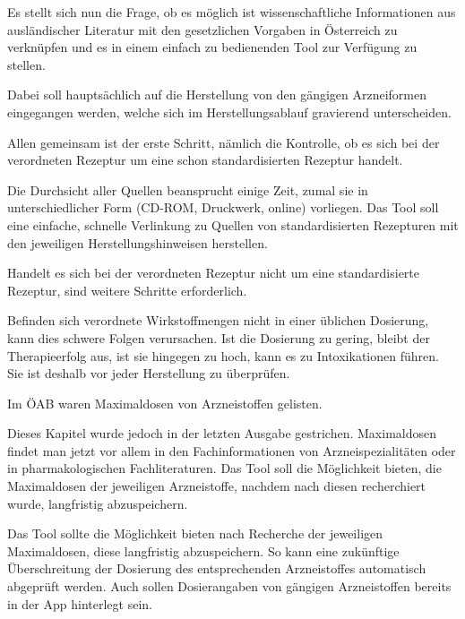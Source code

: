 \documentclass[12pt,a4paper]{article}
\begin{document}
Es stellt sich nun die Frage, ob es möglich ist wissenschaftliche Informationen aus ausländischer Literatur mit den gesetzlichen Vorgaben in Österreich zu verknüpfen und es in einem einfach zu bedienenden Tool zur Verfügung zu stellen. 

Dabei soll hauptsächlich auf die Herstellung von den gängigen Arzneiformen eingegangen werden, welche sich im Herstellungsablauf gravierend unterscheiden. 

Allen gemeinsam ist der erste Schritt, nämlich die Kontrolle, ob es sich bei der verordneten Rezeptur um eine schon standardisierten Rezeptur handelt. 

Die Durchsicht aller Quellen beansprucht einige Zeit, zumal sie in unterschiedlicher Form (CD-ROM, Druckwerk, online) vorliegen. 
Das Tool soll eine einfache, schnelle Verlinkung zu Quellen von standardisierten Rezepturen mit den jeweiligen Herstellungshinweisen herstellen. 

Handelt es sich bei der verordneten Rezeptur nicht um eine standardisierte Rezeptur, sind weitere Schritte erforderlich.


Befinden sich verordnete Wirkstoffmengen nicht in einer üblichen Dosierung, kann dies schwere Folgen verursachen. Ist die Dosierung zu gering, bleibt der Therapieerfolg aus, ist sie hingegen zu hoch, kann es zu Intoxikationen führen. Sie ist deshalb vor jeder Herstellung zu überprüfen. 

Im \ac{ÖAB} waren Maximaldosen von Arzneistoffen gelisten.

Dieses Kapitel wurde jedoch in der letzten Ausgabe gestrichen. Maximaldosen findet man jetzt vor allem in den Fachinformationen von Arzneispezialitäten oder in pharmakologischen Fachliteraturen. 
Das Tool soll die Möglichkeit bieten, die Maximaldosen der jeweiligen Arzneistoffe, nachdem nach diesen recherchiert wurde, langfristig abzuspeichern.

Das Tool sollte die Möglichkeit bieten nach Recherche der jeweiligen Maximaldosen, diese langfristig abzuspeichern. So kann eine zukünftige Überschreitung der Dosierung des entsprechenden Arzneistoffes automatisch abgeprüft werden.
Auch sollen Dosierangaben von gängigen Arzneistoffen bereits in der App hinterlegt sein.
\end{document}
